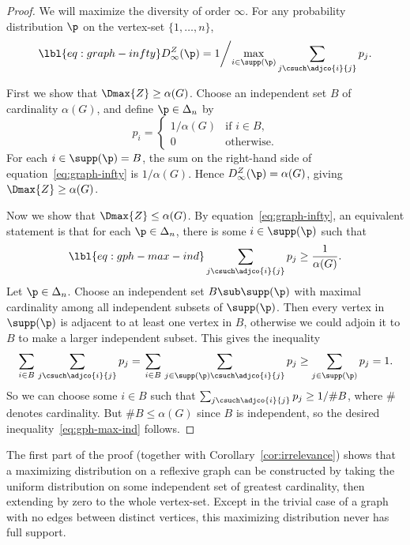 \begin{proof}
We will maximize the diversity of order $\infty$.  For any probability
distribution $\p$ on the vertex-set $\{1, \ldots, n\}$, 
% 
\begin{equation}
\lbl{eq:graph-infty}
D_{\infty}^Z(\p)
=
1 \biggl/
\max_{i \in \supp(\p)} \sum_{j \csuch \adjco{i}{j}} p_j.
\end{equation}

First we show that $\Dmax{Z} \geq \alpha(G)$.  Choose an independent set
$B$ of cardinality $\alpha(G)$, and define $\p \in \Delta_n$ by
\[
p_i
=
\begin{cases}
1/\alpha(G)     &\text{if } i \in B,    \\
0               &\text{otherwise}.
\end{cases}
\]
For each $i \in \supp(\p) = B$, the sum on the right-hand side of
equation~\eqref{eq:graph-infty} is $1/\alpha(G)$.  Hence
$D_{\infty}^Z(\p) = \alpha(G)$, giving $\Dmax{Z} \geq \alpha(G)$.

Now we show that $\Dmax{Z} \leq \alpha(G)$.  By
equation~\eqref{eq:graph-infty}, an equivalent statement is that
for each $\p \in \Delta_n$, there is some $i \in \supp(\p)$ such that
% 
\begin{equation}
\lbl{eq:gph-max-ind}
\sum_{j \csuch \adjco{i}{j}} p_j
\geq
\frac{1}{\alpha(G)}.
\end{equation}
% 
Let $\p \in \Delta_n$.  Choose an independent
set $B \sub \supp(\p)$ with maximal cardinality among all independent
subsets of $\supp(\p)$.  Then every vertex in $\supp(\p)$ is adjacent to at
least one vertex in $B$, otherwise we could adjoin it to $B$ to make a
larger independent subset.  This gives the inequality
\[
\sum_{\,i \in B\,} \sum_{j \csuch \adjco{i}{j}} p_j
=
\sum_{\,i \in B\,} \sum_{j \in \supp(\p) \csuch \adjco{i}{j}} p_j
\geq
\sum_{j \in \supp(\p)} p_j
=
1.
\]
So we can choose some $i \in B$ such that $\sum_{j \csuch \adjco{i}{j}} p_j
\geq 1/\# B$, where $\#$ denotes cardinality.  But $\# B \leq
\alpha(G)$ since $B$ is independent, so the desired
inequality~\eqref{eq:gph-max-ind} follows.
\end{proof}

\begin{remark}
%
%
% 
The first part of the proof (together with Corollary~\ref{cor:irrelevance})
shows that a maximizing distribution on a reflexive graph can be constructed by
taking the uniform distribution on some independent set of greatest
cardinality, then extending by zero to the whole vertex-set.  Except in the
trivial case of a graph with no edges between distinct vertices, this
maximizing distribution never has full support.
\end{remark}


